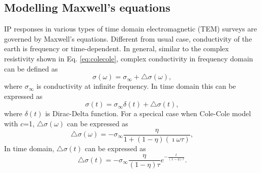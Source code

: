 \documentclass[letterpaper,11pt]{article}
\newcommand{\siginf}{\sigma_\infty}
\newcommand{\dsig}{\triangle\sigma}
\begin{document}

\subsection{Modelling Maxwell's equations}
IP responses in various types of time domain electromagnetic (TEM) surveys are governed by Maxwell’s equations. Different from usual case, conductivity of the earth is frequency or time-dependent. In general, similar to the complex resistivity shown in Eq. \ref{eq:colecole}, complex conductivity in frequency domain can be defined as 
\begin{equation}
  \sigma(\omega) = \siginf + \dsig(\omega),
  \label{eq:sigmaomega}
\end{equation}
where $\siginf$ is conductivity at infinite frequency.
In time domain this can be expressed as
\begin{equation}
  \sigma(t) = \siginf\delta(t) + \dsig(t),
  \label{eq:sigmat}
\end{equation}
where $\delta(t)$ is Dirac-Delta function. For a specical case when Cole-Cole model with $c$=1, $\dsig(\omega)$ can be expressed as 
\begin{equation}
  \dsig(\omega)= -\sigma_{\infty}\frac{\eta}{1+(1-\eta)(\imath\omega\tau)},
\end{equation}
In time domain, $\dsig(t)$ can be expressed as 
\begin{equation}
  \dsig(t)=-\siginf\frac{\eta}{(1-\eta)\tau}e^{-\frac{t}{(1-\eta)\tau}}.  
\end{equation}
\end{document}
